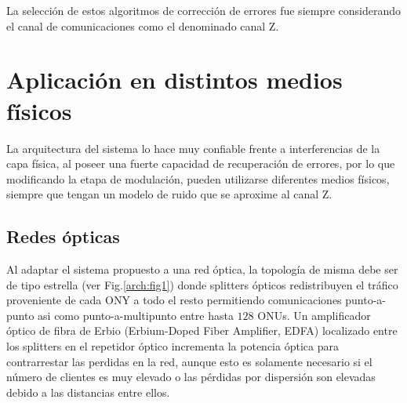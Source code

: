 La selección de estos algoritmos de corrección de errores fue siempre considerando el canal de comunicaciones como el denominado canal Z. %

\section{Aplicación en distintos medios físicos}
La arquitectura del sistema lo hace muy confiable frente a interferencias de la capa física, al poseer una fuerte capacidad de recuperación de errores, por lo que modificando la etapa de modulación, pueden utilizarse diferentes medios físicos, siempre que tengan un modelo de ruido que se aproxime al canal Z.
\subsection{Redes ópticas}


Al adaptar el sistema propuesto a una red óptica, la topología de misma debe ser de tipo estrella (ver Fig.\ref{arch:fig1}) donde splitters ópticos redistribuyen el tráfico proveniente de cada ONY a todo el resto permitiendo comunicaciones punto-a-punto asi como punto-a-multipunto entre hasta $128$ ONUs.
Un amplificador óptico de fibra de Erbio (Erbium-Doped Fiber Amplifier, EDFA) localizado entre los splitters en el repetidor óptico incrementa la potencia óptica para contrarrestar las perdidas en la red, aunque esto es solamente necesario si el número de clientes es muy elevado o las pérdidas por dispersión son elevadas debido a las distancias entre ellos.

